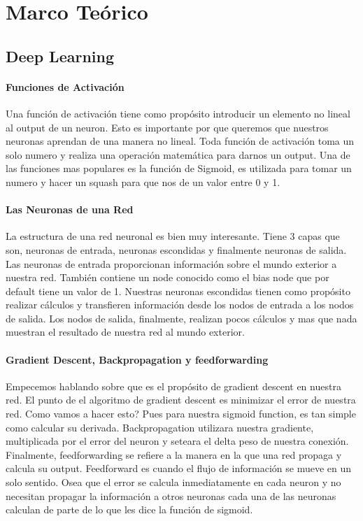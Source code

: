 \section{Marco Te\'orico}
\subsection{Deep Learning}
\paragraph{Funciones de Activaci\'on} Una funci\'on de activaci\'on tiene como prop\'osito introducir un elemento no lineal al output de un neuron. Esto es importante por que queremos que nuestros neuronas aprendan de una manera no lineal. Toda funci\'on de activaci\'on toma un solo numero y realiza una operaci\'on matem\'atica para darnos un output. Una de las funciones mas populares es la funci\'on de Sigmoid, es utilizada para tomar un numero y hacer un squash para que nos de un valor entre 0 y 1.

\paragraph{Las Neuronas de una Red}La estructura de una red neuronal es bien muy interesante. Tiene 3 capas que son, neuronas de entrada, neuronas escondidas y finalmente neuronas de salida. Las neuronas de entrada proporcionan informaci\'on sobre el mundo exterior a nuestra red. Tambi\'en contiene un node conocido como el bias node que por default tiene un valor de 1. Nuestras neuronas escondidas tienen como prop\'osito realizar c\'alculos y transfieren informaci\'on desde los nodos de entrada a los nodos de salida. Los nodos de salida, finalmente, realizan pocos c\'alculos y mas que nada muestran el resultado de nuestra red al mundo exterior.

\paragraph{Gradient Descent, Backpropagation y feedforwarding} Empecemos hablando sobre que es el prop\'osito de gradient descent en nuestra red. El punto de el algoritmo de gradient descent es minimizar el error de nuestra red. Como vamos a hacer esto? Pues para nuestra sigmoid function, es tan simple como calcular su derivada. Backpropagation utilizara nuestra gradiente, multiplicada por el error del neuron y seteara el delta peso de nuestra conexi\'on. Finalmente, feedforwarding se refiere a la manera en la que una red propaga y calcula su output. Feedforward es cuando el flujo de informaci\'on se mueve en un solo sentido. Osea que el error se calcula inmediatamente en cada neuron y no necesitan propagar la informaci\'on a otros neuronas cada una de las neuronas calculan de parte de lo que les dice la funci\'on de sigmoid.
